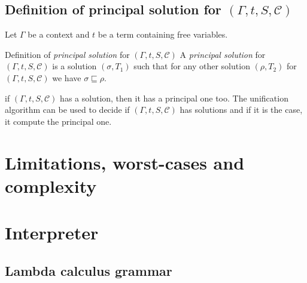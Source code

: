 \documentclass[8pt]{beamer}
\begin{document}
\subsection{Definition of principal solution for $(\Gamma, t,S, \mathcal{C})$}

\begin{frame}
    Let $\Gamma$ be a context and $t$ be a term containing free variables.
    \begin{block}{Definition of \emph{principal solution} for 
            $(\Gamma, t, S, \mathcal{C})$}
        A  \emph{principal solution} for $(\Gamma, t, S, \mathcal{C})$ 
        is a solution $(\sigma, T_{1})$ such that for any other solution
        $(\rho, T_2)$ for $(\Gamma, t, S, \mathcal{C})$ we have $\sigma 
        \sqsubseteq \rho$.
    \end{block}
    \pause
    \begin{theorem}
        if $(\Gamma, t, S, \mathcal{C})$ has a solution, then it has a 
        principal one too. The unification algorithm can be used to
        decide if $(\Gamma, t, S, \mathcal{C})$ has solutions and if it 
        is the case, it compute the principal one.
    \end{theorem}
\end{frame}

\section{Limitations, worst-cases and complexity}

\section{Interpreter}

\subsection{Lambda calculus grammar}
\end{document}
